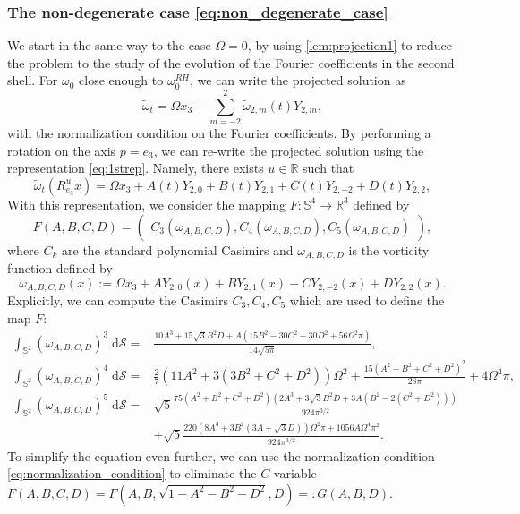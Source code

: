 \documentclass{amsart}
\def\R{{\mathbb{R}}}
\def\erre{{\mathbb{R}}}
\begin{document}
\subsubsection{The non-degenerate case \eqref{eq:non_degenerate_case}}\label{non_degenerate}
We start in the same way to the case $\Omega=0$, by using \cref{lem:projection1} to reduce the problem to the study of the evolution of the Fourier coefficients in the second shell. For $\omega_0$ close enough to $\omega_0^{RH}$, we can write the projected solution as
\begin{equation*}
    \tilde\omega_t = \Omega x_3 + \sum_{m=-2}^2 \tilde\omega_{2,m}(t) Y_{2,m},  
\end{equation*}
with the normalization condition on the Fourier coefficients. By performing a rotation on the axis $p=e_3$, we can re-write the projected solution using the representation \eqref{eq:1strep}. Namely, there exists $u\in\R$ such that
\begin{equation}
    \tilde\omega_t(R^u_{e_3}x) = \Omega x_3 + A(t) Y_{2,0} + B(t) Y_{2,1} + C(t) Y_{2,-2} + D(t) Y_{2,2},
    \label{eq:representation_1_first_two_shells}
\end{equation}
With this representation, we consider the mapping $F:\mathbb{S}^4\to\erre^3$ defined by
\begin{equation}
    F(A,B,C,D)=\begin{pmatrix}C_3(\omega_{A,B,C,D}),C_4(\omega_{A,B,C,D}),C_5(\omega_{A,B,C,D})\end{pmatrix},
\end{equation}
where $C_k$ are the standard polynomial Casimirs and $\omega_{A,B,C,D}$ is the vorticity function defined by
\begin{equation*}
    \omega_{A,B,C,D}(x):=\Omega x_3 + A Y_{2,0}(x) + B Y_{2,1}(x) + C Y_{2,-2}(x) + D Y_{2,2}(x).
\end{equation*}
Explicitly, we can compute the Casimirs $C_3,C_4,C_5$ which are used to define the map $F$:
\begin{align*}
    \int_{\mathbb{S}^2}(\omega_{A,B,C,D})^3\;\mathrm{d}\mathcal{S}=&\frac{10 A^{3} + 15 \sqrt{3} B^{2} D + A \left(15 B^{2} - 30 C^{2} - 30 D^{2} + 56 \Omega^{2} \pi \right)}{14 \sqrt{5 \pi}}, \\
    \int_{\mathbb{S}^2}(\omega_{A,B,C,D})^4\;\mathrm{d}\mathcal{S}=&\frac{2}{7} \left( 11 A^{2} + 3 \left( 3 B^{2} + C^{2} + D^{2} \right) \right) \Omega^{2} + \frac{15 \left( A^{2} + B^{2} + C^{2} + D^{2} \right)^{2}}{28 \pi} + 4 \Omega^{4} \pi, \\
    \int_{\mathbb{S}^2}(\omega_{A,B,C,D})^5\;\mathrm{d}\mathcal{S}=&\sqrt{5}\frac{75 (A^{2} + B^{2} + C^{2} + D^{2}) \left( 2 A^{3} + 3 \sqrt{3} B^{2} D + 3 A \left( B^{2} - 2 (C^{2} + D^{2}) \right) \right)}{924 \pi^{3/2}}\\
    &+\sqrt{5}\frac{220 \left( 8 A^{3} + 3 B^{2} \left( 3 A + \sqrt{3} D \right) \right) \Omega^{2} \pi+ 1056 A \Omega^{4} \pi^{2}}{924 \pi^{3/2}}.
\end{align*}
To simplify the equation even further, we can use the normalization condition \eqref{eq:normalization_condition} to eliminate the $C$ variable $F(A,B,C,D)=F(A,B,\sqrt{1-A^2-B^2-D^2},D)=:G(A,B,D)$.
\end{document}
